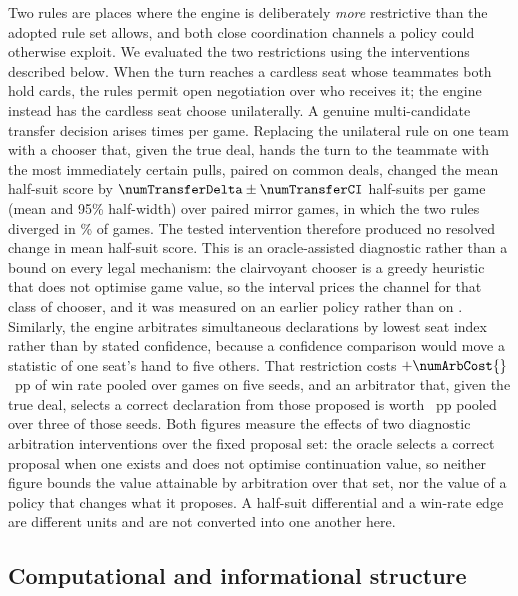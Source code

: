 Two rules are places where the engine is deliberately \emph{more} restrictive than the adopted
rule set allows, and both close coordination channels a policy could otherwise exploit. We evaluated
the two restrictions using the interventions described below. When the turn reaches a cardless seat
whose teammates both hold cards, the rules permit open negotiation over who receives it; the engine
instead has the cardless seat choose unilaterally. A genuine multi-candidate transfer decision
arises \numTransferEvents{} times per game. Replacing the unilateral rule on one team with a
chooser that, given the true deal, hands the turn to the teammate with the most immediately certain
pulls, paired on common deals, changed the mean half-suit score by
$\numTransferDelta \pm \numTransferCI$ half-suits per game (mean and 95\% half-width) over
\numTransferGames{} paired \vfour{} mirror games, in which the two rules diverged in
\numTransferDiverged\% of games. The tested intervention therefore produced no resolved change in
mean half-suit score. This is an oracle-assisted diagnostic rather than a bound on every legal
mechanism: the clairvoyant chooser is a greedy heuristic that does not optimise game value, so the
interval prices the channel for that class of chooser, and it was measured on an earlier policy
rather than on \sestina{}. Similarly, the engine arbitrates simultaneous declarations by lowest seat
index rather than by stated confidence, because a confidence comparison would move a statistic of
one seat's hand to five others. That restriction costs $+\numArbCost{}$~pp of win rate pooled over
\numArbGames{} games on five seeds, and an arbitrator that, given the true deal, selects a correct
declaration from those proposed is worth \numArbOracle{}~pp pooled over three of those seeds. Both
figures measure the effects of two diagnostic arbitration interventions over the fixed proposal
set: the oracle selects a correct proposal when one exists and does not optimise continuation
value, so neither figure bounds the value attainable by arbitration over that set, nor the value of
a policy that changes what it proposes. A half-suit differential and a win-rate edge are different units and are
not converted into one another here.

\subsection{Computational and informational structure}
\label{sec:game-why}

